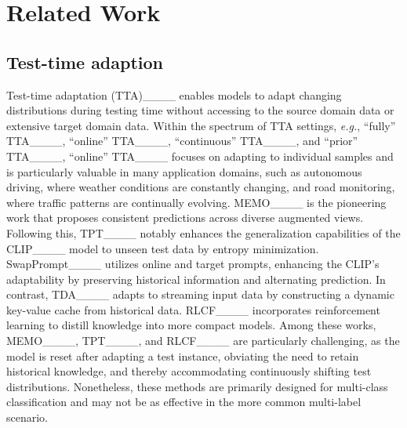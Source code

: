 \section{Related Work}
\subsection{Test-time adaption}
Test-time adaptation (TTA)____ enables models to adapt changing distributions during testing time without accessing to the source domain data or extensive target domain data. Within the spectrum of TTA settings, \textit{e.g.}, ``fully'' TTA____, ``online'' TTA____, ``continuous'' TTA____, and ``prior'' TTA____, ``online'' TTA____ focuses on adapting to individual samples and is particularly valuable in many application domains, such as autonomous driving, where weather conditions are constantly changing, and road monitoring, where traffic patterns are continually evolving. MEMO____ is the pioneering work that proposes consistent predictions across diverse augmented views. Following this, TPT____ notably enhances the generalization capabilities of the CLIP____ model to unseen test data by entropy minimization. SwapPrompt____ utilizes online and target prompts, enhancing the CLIP's adaptability by preserving historical information and alternating prediction. In contrast, TDA____ adapts to streaming input data by constructing a dynamic key-value cache from historical data. RLCF____ incorporates reinforcement learning to distill knowledge into more compact models. Among these works, MEMO____, TPT____, and RLCF____ are particularly challenging, as the model is reset after adapting a test instance, obviating the need to retain historical knowledge, and thereby accommodating continuously shifting test distributions. Nonetheless, these methods are primarily designed for multi-class classification and may not be as effective in the more common multi-label scenario.

